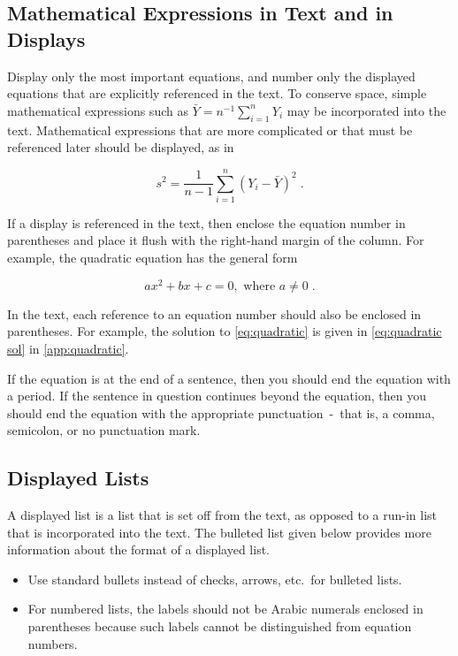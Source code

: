 \documentclass{scspaperproc}
\theoremstyle{scsthe}
\begin{document}
\subsection{Mathematical Expressions in Text and in Displays}
Display only the most important equations, and number only the displayed equations that are explicitly referenced in the text. To conserve space, simple mathematical expressions such as \mbox{$\bar Y = n^{-1} \sum_{i=1}^n Y_i$} may be incorporated into the text. Mathematical expressions that are more complicated or that must be referenced later should be displayed, as in

\begin{equation}
s^2 = \frac 1 {n-1} \sum_{i=1}^n (Y_i - \bar Y)^2\;. \nonumber
\end{equation}

If a display is referenced in the text, then enclose the equation number in parentheses and place it flush with the right-hand margin of the column. For example, the quadratic equation has the general form

\begin{equation} \label{eq:quadratic}
ax^2 + bx + c = 0, \mbox{ where } a \ne 0\;.
\end{equation}

In the text, each reference to an equation number should also be enclosed in parentheses. For example, the solution to \eqref{eq:quadratic} is given in \eqref{eq:quadratic sol} in \autoref{app:quadratic}.

If the equation is at the end of a sentence, then you should end the equation with a period. If the sentence in question continues beyond the equation, then you should end the equation with the appropriate punctuation~-~that is, a comma, semicolon, or no punctuation mark.


\subsection{Displayed Lists}
A displayed list is a list that is set off from the text, as opposed to a run-in list that is incorporated into the text. The bulleted list given below provides more information about the format of a displayed list. 
\begin{itemize}
	\item Use standard bullets instead of checks, arrows, etc.\ for bulleted lists.
	\item For numbered lists, the labels should not be Arabic numerals enclosed in parentheses because such labels cannot be distinguished from equation numbers.
\end{itemize}
\end{document}
